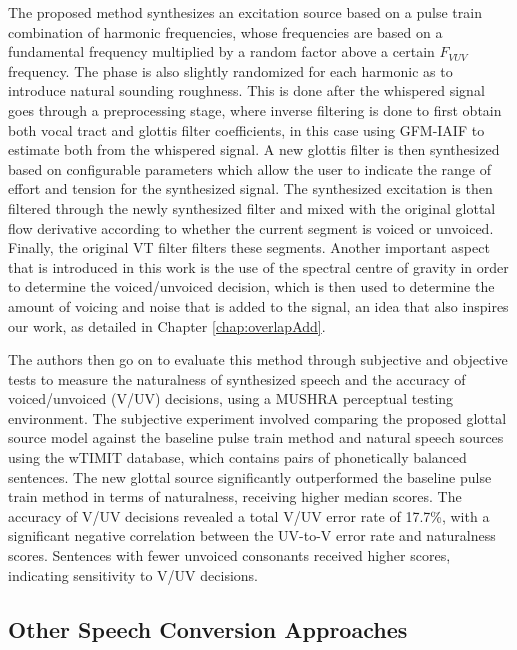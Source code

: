 The proposed method synthesizes an excitation source based on a pulse train combination of harmonic frequencies, whose frequencies are based on a fundamental frequency multiplied by a random factor above a certain $F_{VUV}$ frequency. The phase is also slightly randomized for each harmonic as to introduce natural sounding roughness. This is done after the whispered signal goes through a preprocessing stage, where inverse filtering is done to first obtain both vocal tract and glottis filter coefficients, in this case using GFM-IAIF \cite{alkuGlottalWaveAnalysis1992} to estimate both from the whispered signal. A new glottis filter is then synthesized based on configurable parameters which allow the user to indicate the range of effort and tension \cite{feugereCantorDigitalisChironomic2017} for the synthesized signal. The synthesized excitation is then filtered through the newly synthesized filter and mixed with the original glottal flow derivative according to whether the current segment is voiced or unvoiced. Finally, the original VT filter filters these segments. Another important aspect that is introduced in this work is the use of the spectral centre of gravity in order to determine the voiced/unvoiced decision, which is then used to determine the amount of voicing and noise that is added to the signal, an idea that also inspires our work, as detailed in Chapter \ref{chap:overlapAdd}.

The authors then go on to evaluate this method through subjective and objective tests to measure the naturalness of synthesized speech and the accuracy of voiced/unvoiced (V/UV) decisions, using a MUSHRA \cite{internationaltelecommunicationunionBS15343Method2015} perceptual testing environment. The subjective experiment involved comparing the proposed glottal source model against the baseline pulse train method and natural speech sources using the wTIMIT database, which contains pairs of phonetically balanced sentences. The new glottal source significantly outperformed the baseline pulse train method in terms of naturalness, receiving higher median scores. The accuracy of V/UV decisions revealed a total V/UV error rate of 17.7\%, with a significant negative correlation between the UV-to-V error rate and naturalness scores. Sentences with fewer unvoiced consonants received higher scores, indicating sensitivity to V/UV decisions.


\subsection{Other Speech Conversion Approaches}

